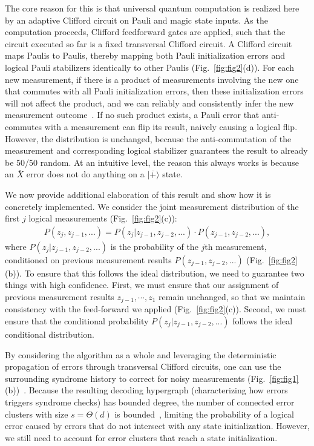 \documentclass[prl,twocolumn,superscriptaddress,secnumarabic,balancelastpage,amsmath,amssymb]{revtex4-2}
\newcommand{\lket}[1]{|{\overline{#1}}\rangle}
\begin{document}
The core reason for this is that universal quantum computation is realized here by an adaptive Clifford circuit on Pauli and magic state inputs.
%
As the computation proceeds, Clifford feedforward gates are applied, such that the circuit executed so far is a fixed transversal Clifford circuit.
%
A Clifford circuit maps Paulis to Paulis, thereby mapping both Pauli initialization errors and logical Pauli stabilizers identically to other Paulis (Fig.~\ref{fig:fig2}(d)).
%
For each new measurement, if there is a product of measurements involving the new one that commutes with all Pauli initialization errors, then these initialization errors will not affect the product, and we can reliably and consistently infer the new measurement outcome~\cite{cain2025fast,serra-peralta2025decoding}.
%
If no such product exists, a Pauli error that anti-commutes with a measurement can flip its result, naively causing a logical flip.
%
However, the distribution is unchanged, because the anti-commutation of the measurement and corresponding logical stabilizer guarantees the result to already be 50/50 random.
%
At an intuitive level, the reason this always works is because an $\bar{X}$ error does not do anything on a $\lket{+}$ state.


We now provide additional elaboration of this result and show how it is concretely implemented.
%
We consider the joint measurement distribution of the first $j$ logical measurements (Fig.~\ref{fig:fig2}(c)):
\begin{align}
P(z_j,z_{j-1},...)=P(z_j|z_{j-1},z_{j-2},...)\cdot P(z_{j-1},z_{j-2},...),
\label{eq:conditional_distribution}
\end{align}
where $P(z_j|z_{j-1},z_{j-2},...)$ is the probability of the $j$th measurement, conditioned on previous measurement results $P(z_{j-1},z_{j-2},...)$ (Fig.~\ref{fig:fig2}(b)).
%
To ensure that this follows the ideal distribution, we need to guarantee two things with high confidence.
%
First, we must ensure that our assignment of previous measurement results $z_{j-1},\cdots,z_1$ remain unchanged, so that we maintain consistency with the feed-forward we applied (Fig.~\ref{fig:fig2}(c)).
%
Second, we must ensure that the conditional probability $P(z_j|z_{j-1},z_{j-2},...)$ follows the ideal conditional distribution.

By considering the algorithm as a whole and leveraging the deterministic propagation of errors through transversal Clifford circuits, one can use the surrounding syndrome history to correct for noisy measurements (Fig.~\ref{fig:fig1}(b))~\cite{cain2024correlated}.
%
Because the resulting decoding hypergraph (characterizing how errors triggers syndrome checks) has bounded degree, the number of connected error clusters with size $s=\Theta(d)$ is bounded~\cite{gottesman2013fault,kovalev2013fault}, limiting the probability of a logical error caused by errors that do not intersect with any state initialization.
%
However, we still need to account for error clusters that reach a state initialization.
\end{document}
